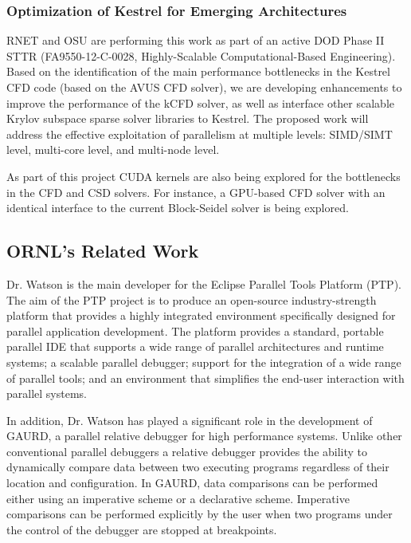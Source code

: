 \subsubsection{Optimization of Kestrel for Emerging Architectures}
RNET and OSU are performing this work as part of an active DOD Phase
II STTR (FA9550-12-C-0028, Highly-Scalable Computational-Based
Engineering). Based on the identification of the main performance
bottlenecks in the Kestrel CFD code (based on the AVUS CFD solver), we
are developing enhancements to improve the performance of the kCFD
solver, as well as interface other scalable Krylov subspace sparse
solver libraries to Kestrel. The proposed work will address the
effective exploitation of parallelism at multiple levels: SIMD/SIMT
level, multi-core level, and multi-node level.

As part of this project CUDA kernels are also being explored for the
bottlenecks in the CFD and CSD solvers. For instance, a GPU-based CFD
solver with an identical interface to the current Block-Seidel solver
is being explored.



\subsection{ORNL's Related Work}
\label{sec:nice}

Dr. Watson is the main developer for the Eclipse Parallel Tools Platform (PTP). The aim of the PTP project is to produce an open-source industry-strength platform that provides a highly integrated environment specifically designed for parallel application development. The platform provides a standard, portable parallel IDE that supports a wide range of parallel architectures and runtime systems; a scalable parallel debugger; support for the integration of a wide range of parallel tools; and an environment that simplifies the end-user interaction with parallel systems. 

In addition, Dr. Watson has played a significant role in the development of GAURD, a parallel relative debugger for high performance systems. Unlike other conventional parallel debuggers a relative debugger provides the
ability to dynamically compare data between two executing programs regardless of their location and configuration. In GAURD, data
comparisons can be performed either using an imperative scheme or a declarative scheme. Imperative comparisons can be performed
explicitly by the user when two programs under the control of the debugger are stopped at breakpoints. 

